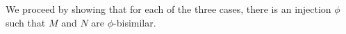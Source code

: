 \documentclass{article}
\theoremstyle{plain}
\theoremstyle{definition}
\theoremstyle{remark}
\newcommand{\enables}{\vdash} %
\begin{document}
%

We proceed by showing that for each of the three cases, there is an injection $\phi$ such that $M$ and $N$ are $\phi$-bisimilar.
\end{document}
